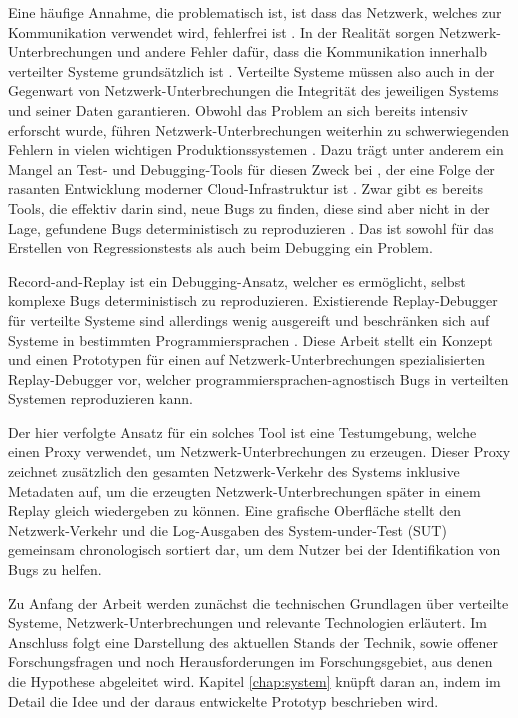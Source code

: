 \documentclass[12pt,a4paper]{report}
\begin{document}
Eine häufige Annahme, die problematisch ist, ist dass das Netzwerk, welches zur Kommunikation verwendet wird,
fehlerfrei ist \cite{brief_introduction_to_distributed_systems, the_network_is_reliable}. In der Realität sorgen
Netzwerk-Unterbrechungen und andere Fehler dafür, dass die Kommunikation innerhalb verteilter Systeme grundsätzlich
ist \cite{distributed_systems_book, distributed_systems_concepts_and_design}. Verteilte Systeme müssen also auch in der Gegenwart
von Netzwerk-Unterbrechungen die Integrität des jeweiligen Systems und seiner Daten garantieren. Obwohl das Problem an sich bereits
intensiv erforscht wurde, führen Netzwerk-Unterbrech\-ungen weiterhin zu schwerwiegenden Fehlern in vielen wichtigen
Produktionssystemen \cite{analysis_of_network_partition_failures}. Dazu trägt unter anderem ein Mangel an Test- und
Debugging-Tools für diesen Zweck bei \cite{failify_paper,simple_testing_can_prevent}, der eine Folge der rasanten Entwicklung
moderner Cloud-Infrastruktur ist \cite{why_does_cloud_stop_computing}. Zwar gibt es bereits Tools, die effektiv darin sind, neue
Bugs zu finden, diese sind aber nicht in der Lage, gefundene Bugs deterministisch zu reproduzieren \cite{failify_paper}. Das ist
sowohl für das Erstellen von Regressionstests als auch beim Debugging ein Problem.

Record-and-Replay ist ein Debugging-Ansatz, welcher es ermöglicht, selbst komplexe Bugs deterministisch zu reproduzieren.
Existierende Replay-Debug\-ger für verteilte Systeme sind allerdings wenig ausgereift und beschränken sich auf Systeme in bestimmten
Programmiersprachen \cite{distributed_replay_debugging_1997,distributed_replay_debugging_2006}. Diese Arbeit stellt ein Konzept
und einen Prototypen für einen auf Netzwerk-Unterbrech\-ungen spezialisierten Replay-Debugger vor, welcher
programmiersprachen-agnostisch Bugs in verteilten Systemen reproduzieren kann.

Der hier verfolgte Ansatz für ein solches Tool ist eine Testumgebung, welche einen Proxy verwendet, um Netzwerk-Unterbrechungen zu
erzeugen. Dieser Proxy zeichnet zusätzlich den gesamten Netzwerk-Verkehr des Systems inklusive Metadaten auf, um die erzeugten
Netzwerk-Unterbrechungen später in einem Replay gleich wiedergeben zu können. Eine grafische Oberfläche stellt den
Netzwerk-Verkehr und die Log-Ausgaben des System-under-Test (SUT) gemeinsam chronologisch sortiert dar, um dem Nutzer bei
der Identifikation von Bugs zu helfen.

Zu Anfang der Arbeit werden zunächst die technischen Grundlagen über verteilte Systeme, Netzwerk-Unterbrechungen und relevante
Technologien erläutert. Im Anschluss folgt eine Darstellung des aktuellen Stands der Technik, sowie offener Forschungsfragen und
noch Herausforderungen im Forschungsgebiet, aus denen die Hypothese abgeleitet wird. Kapitel \ref{chap:system} knüpft daran an,
indem im Detail die Idee und der daraus entwickelte Prototyp beschrieben wird.
\end{document}
